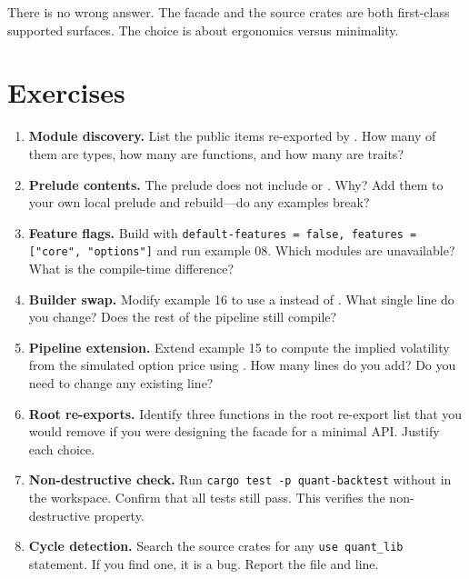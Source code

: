 There is no wrong answer. The facade and the source crates are both
first-class supported surfaces. The choice is about ergonomics versus
minimality.

\section{Exercises}

\begin{enumerate}
    \item \textbf{Module discovery.} List the public items re-exported
          by . How many of them are
          types, how many are functions, and how many are traits?
    \item \textbf{Prelude contents.} The prelude does not include
           or . Why? Add them
          to your own local prelude and rebuild---do any examples
          break?
    \item \textbf{Feature flags.} Build  with
          \texttt{default-features = false, features = ["core",
          "options"]} and run example 08. Which modules are
          unavailable? What is the compile-time difference?
    \item \textbf{Builder swap.} Modify example 16 to use a
           instead of
          . What single line do you change?
          Does the rest of the pipeline still compile?
    \item \textbf{Pipeline extension.} Extend example 15 to compute
          the implied volatility from the simulated option price
          using . How many lines do you add? Do
          you need to change any existing line?
    \item \textbf{Root re-exports.} Identify three functions in the
          root re-export list that you would remove if you were
          designing the facade for a minimal API. Justify each
          choice.
    \item \textbf{Non-destructive check.} Run \texttt{cargo test -p
          quant-backtest} without  in the workspace.
          Confirm that all tests still pass. This verifies the
          non-destructive property.
    \item \textbf{Cycle detection.} Search the source crates for any
          \texttt{use quant\_lib} statement. If you find one, it is a
          bug. Report the file and line.
\end{enumerate}

